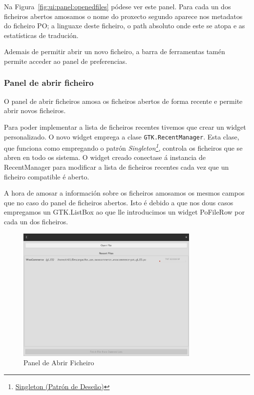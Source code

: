 Na Figura~\ref{fig:ui:panel:openedfiles} pódese ver este panel. Para cada un dos ficheiros abertos amosamos o nome do proxecto segundo aparece nos metadatos do ficheiro PO; a linguaxe deste ficheiro, o path absoluto onde este se atopa e as estatísticas de tradución.

Ademais de permitir abrir un novo ficheiro, a barra de ferramentas tamén permite acceder ao panel de preferencias.

\subsubsection{Panel de abrir ficheiro}

O panel de abrir ficheiros amosa os ficheiros abertos de forma recente e permite abrir novos ficheiros.

Para poder implementar a lista de ficheiros recentes tivemos que crear un widget personalizado. O novo widget emprega a clase \lstinline{GTK.RecentManager}. Esta clase, que funciona como empregando o patrón \emph{Singleton\footnote{\href{http://gl.wikipedia.org/wiki/Singleton}{Singleton (Patrón de Deseño)}}}, controla os ficheiros que se abren en todo os sistema. O widget creado conectase á instancia de RecentManager para modificar a lista de ficheiros recentes cada vez que un ficheiro compatible é aberto.

A hora de amosar a información sobre os ficheiros amosamos os mesmos campos que no caso do panel de ficheiros abertos. Isto é debido a que nos dous casos empregamos un GTK.ListBox ao que lle introducimos un widget PoFileRow por cada un dos ficheiros.

\begin{figure}[h!]
  \centering
    \includegraphics[width=0.8\textwidth]{img/panel_abrir_ficheiro.png}
    \caption{Panel de Abrir Ficheiro}
    \label{fig:ui:panel:openfile}
\end{figure}

